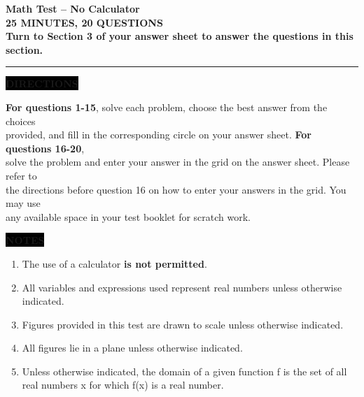 
{\selectfont
\enlargethispage{2cm}

\hspace*{25mm}
\parbox{14cm}{%
{\huge \textbf{Math Test -- No Calculator}}\\

{\Large \textbf{25 MINUTES, 20 QUESTIONS}} \\[3mm]


\textbf{Turn to Section 3 of your answer sheet to answer the questions in this section.}\\[2mm]
%
}
\hrule height 1pt

\vspace*{5mm}


\hspace*{25mm}
\parbox{14cm}{%
\raggedright
\colorbox{black}{\color{white}\textbf{\small DIRECTIONS}}\hskip-2pt

\vspace*{5mm}

\textbf{For questions 1-15}, solve each problem, choose the best answer from the choices\\
provided, and fill in the corresponding circle on your answer sheet. \textbf{For questions 16-20},\\
solve the problem and enter your answer in the grid on the answer sheet. Please refer to\\
the directions before question 16 on how to enter your answers in the grid. You may use\\
any available space in your test booklet for scratch work.
}

\vspace*{3mm}


\hspace*{25mm}
\parbox{15cm}{%
\raggedright
\colorbox{black}{\color{white}\textbf{\small NOTES}}\hskip-2pt

\vspace*{0mm}

\begin{enumerate}[itemsep=0mm,leftmargin=5mm]
	\item The use of a calculator \textbf{is not permitted}.
	\item All variables and expressions used represent real numbers unless otherwise indicated.
	\item Figures provided in this test are drawn to scale unless otherwise indicated.
	\item All figures lie in a plane unless otherwise indicated.
	\item Unless otherwise indicated, the domain of a given function f is the set of all real numbers x for which f(x) is a real number.
\end{enumerate}	
	}

}
